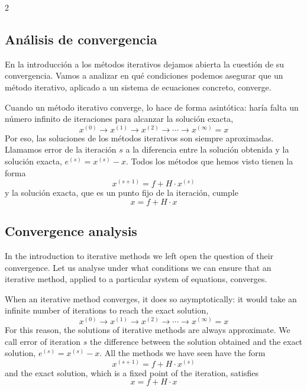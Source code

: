 \begin{paracol}{2}
\subsection{Análisis de convergencia}\label{sec:convergencia_it}
En la introducción a los métodos iterativos dejamos abierta la cuestión de su convergencia. Vamos a analizar en qué condiciones podemos asegurar que un método iterativo, aplicado a un sistema de ecuaciones concreto, converge.

Cuando un método iterativo converge, lo hace de forma asintótica: haría falta un número infinito de iteraciones para alcanzar la solución exacta,
\begin{equation*}
x^{(0)}\rightarrow x^{(1)} \rightarrow x^{(2)}\rightarrow \cdots \rightarrow x^{(\infty)}=x
\end{equation*}
Por eso, las soluciones de los métodos iterativos son siempre aproximadas. Llamamos error de la iteración $s$ a la diferencia entre la solución obtenida y la solución exacta, $e^{(s)}=x^{(s)}-x$. Todos los métodos que hemos visto tienen la forma
\begin{equation*}
x^{(s+1)}=f+H\cdot x^{(s)}
\end{equation*}
y la solución exacta, que es un punto fijo de la iteración, cumple
\begin{equation*}
x=f+H\cdot x
\end{equation*}

\switchcolumn
\subsection{Convergence analysis}\label{sec:convergencia_it-2}
In the introduction to iterative methods we left open the question of their convergence. Let us analyse under what conditions we can ensure that an iterative method, applied to a particular system of equations, converges.

When an iterative method converges, it does so asymptotically: it would take an infinite number of iterations to reach the exact solution,
\begin{equation*}
x^{(0)}\rightarrow x^{(1)} \rightarrow x^{(2)}\rightarrow \cdots \rightarrow x^{(\infty)}=x
\end{equation*}
For this reason, the solutions of iterative methods are always approximate. We call error of iteration $s$ the difference between the solution obtained and the exact solution, $e^{(s)}=x^{(s)}-x$. All the methods we have seen have the form
\begin{equation*}
x^{(s+1)}=f+H\cdot x^{(s)}
\end{equation*}
and the exact solution, which is a fixed point of the iteration, satisfies
\begin{equation*}
x=f+H\cdot x
\end{equation*}


\end{paracol}
